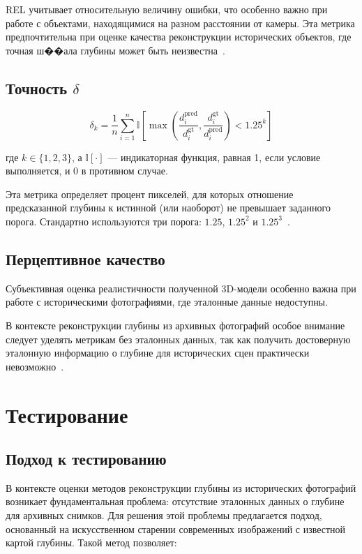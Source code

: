 REL учитывает относительную величину ошибки, что особенно важно при работе с объектами, находящимися на разном расстоянии от камеры. Эта метрика предпочтительна при оценке качества реконструкции исторических объектов, где точная ш��ала глубины может быть неизвестна~\cite{zhang2025review}.

\subsection{Точность $\delta$}
\begin{equation}
\delta_{k} = \frac{1}{n} \sum_{i=1}^{n} \mathbb{I}\left[\max\left(\frac{d_{i}^{\text{pred}}}{d_{i}^{\text{gt}}}, \frac{d_{i}^{\text{gt}}}{d_{i}^{\text{pred}}}\right) < 1.25^k\right]
\end{equation}

где $k \in \{1, 2, 3\}$, а $\mathbb{I}[\cdot]$ — индикаторная функция, равная 1, если условие выполняется, и 0 в противном случае.

Эта метрика определяет процент пикселей, для которых отношение предсказанной глубины к истинной (или наоборот) не превышает заданного порога. Стандартно используются три порога: $1.25$, $1.25^2$ и $1.25^3$~\cite{vis2}.

\subsection{Перцептивное качество}
Субъективная оценка реалистичности полученной 3D-модели особенно важна при работе с историческими фотографиями, где эталонные данные недоступны.


В контексте реконструкции глубины из архивных фотографий особое внимание следует уделять метрикам без эталонных данных, так как получить достоверную эталонную информацию о глубине для исторических сцен практически невозможно~\cite{zaharov2011}.


\section{Тестирование}

\subsection{Подход к тестированию}

В контексте оценки методов реконструкции глубины из исторических фотографий возникает фундаментальная проблема: отсутствие эталонных данных о глубине для архивных снимков.
Для решения этой проблемы предлагается подход, основанный на искусственном старении современных изображений с известной картой глубины.
Такой метод позволяет:

